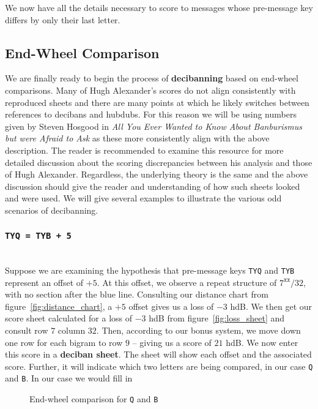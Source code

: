   \noindent We now have all the details necessary to score to
  messages whose pre-message key differs by only their last letter.

  \subsection{End-Wheel Comparison}
  We are finally ready to begin the process of {\bf{decibanning}}
  based on end-wheel comparisons. Many of Hugh Alexander's scores do
  not align consistently with reproduced sheets and there are many
  points at which he likely switches between references to decibans
  and hubdubs. For this reason we will be using numbers given by
  Steven Hosgood in \emph{All You Ever Wanted to Know About
  Banburismus but were Afraid to Ask} as these more consistently align
  with the above description. The reader is recommended to examine
  this resource for more detailed discussion about the scoring
  discrepancies between his analysis and those of Hugh Alexander.
  Regardless, the underlying theory is the same and the above
  discussion should give the reader and understanding of how such
  sheets looked and were used. We will give several examples to
  illustrate the various odd scenarios of decibanning.
  \subsubsection{\texttt{TYQ = TYB + 5}}
  \text{}\\Suppose we are examining the hypothesis that pre-message
  keys \texttt{TYQ} and \texttt{TYB} represent an offset of $+5$. At
  this offset, we observe a repeat structure of $7^\texttt{xx}/32$,
  with no section after the blue line. Consulting our distance chart
  from figure~\ref{fig:distance_chart}, a $+5$ offset gives us a loss
  of $-3$ hdB. We then get our score sheet calculated for a loss of
  $-3$ hdB from figure~\ref{fig:loss_sheet} and consult row $7$
  column $32$. Then, according to our bonus system, we move down one
  row for each bigram to row $9$ -- giving us a score of $21$ hdB. We
  now enter this score in a  {\bf{deciban sheet}}. The sheet will
  show each offset and the associated score. Further, it will
  indicate which two letters are being compared, in our case
  \texttt{Q} and \texttt{B}. In our case we would fill in

  \begin{figure}[H]
    \begin{center}
    \end{center}
    \caption{End-wheel comparison for \texttt{Q} and \texttt{B}}
  \end{figure}

